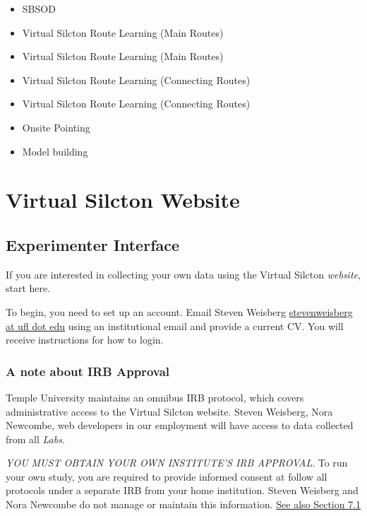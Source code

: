 \documentclass[
  12pt,
]{book}
\providecommand{\tightlist}{%
  \setlength{\itemsep}{0pt}\setlength{\parskip}{0pt}}
\begin{document}
\begin{itemize}
\tightlist
\item
  SBSOD
\item
  Virtual Silcton Route Learning (Main Routes)
\item
  Virtual Silcton Route Learning (Main Routes)
\item
  Virtual Silcton Route Learning (Connecting Routes)
\item
  Virtual Silcton Route Learning (Connecting Routes)
\item
  Onsite Pointing
\item
  Model building
\end{itemize}

\hypertarget{part-virtual-silcton-website}{%
\part{Virtual Silcton Website}\label{part-virtual-silcton-website}}

\hypertarget{experimenter-interface}{%
\chapter{Experimenter Interface}\label{experimenter-interface}}

If you are interested in collecting your own data using the Virtual Silcton \emph{website}, start here.

To begin, you need to set up an account. Email Steven Weisberg \href{mailto:stevenweisberg@ufl.edu}{stevenweisberg at ufl dot edu} using an institutional email and provide a current CV. You will receive instructions for how to login.

\hypertarget{a-note-about-irb-approval}{%
\section{A note about IRB Approval}\label{a-note-about-irb-approval}}

Temple University maintains an omnibus IRB protocol, which covers administrative access to the Virtual Silcton website. Steven Weisberg, Nora Newcombe, web developers in our employment will have access to data collected from all \emph{Labs}.

\emph{YOU MUST OBTAIN YOUR OWN INSTITUTE'S IRB APPROVAL}. To run your own study, you are required to provide informed consent at follow all protocols under a separate IRB from your home institution. Steven Weisberg and Nora Newcombe do not manage or maintain this information. \protect\hyperlink{consent}{See also Section 7.1}
\end{document}
